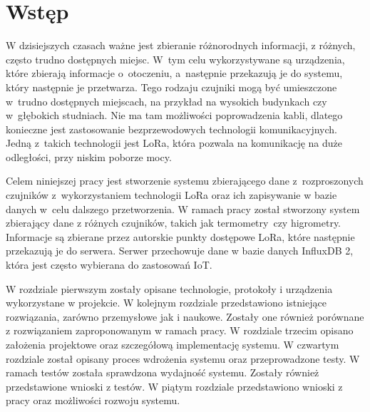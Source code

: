
\chapter*{Wstęp} %
W dzisiejszych czasach ważne jest zbieranie różnorodnych informacji, z różnych, często trudno dostępnych miejsc. W~tym celu wykorzystywane są urządzenia, które zbierają informacje o~otoczeniu, a~następnie przekazują je do systemu, który następnie je przetwarza. Tego rodzaju czujniki mogą być umieszczone w~trudno dostępnych miejscach, na przykład na wysokich budynkach czy w~głębokich studniach. Nie ma tam możliwości poprowadzenia kabli, dlatego konieczne jest zastosowanie bezprzewodowych technologii komunikacyjnych. Jedną z~takich technologii jest LoRa, która pozwala na komunikację na duże odległości, przy niskim poborze mocy.

Celem niniejszej pracy jest stworzenie systemu zbierającego dane z~rozproszonych czujników z~wykorzystaniem technologii LoRa oraz ich zapisywanie w bazie danych w~celu dalszego przetworzenia.
W ramach pracy został stworzony system zbierający dane z różnych czujników, takich jak termometry~czy higrometry.
Informacje są zbierane przez autorskie punkty dostępowe LoRa, które następnie przekazują je do serwera.
Serwer przechowuje dane w bazie danych InfluxDB 2, która jest często wybierana do zastosowań IoT.

W rozdziale pierwszym zostały opisane technologie, protokoły i urządzenia wykorzystane w projekcie.
W kolejnym rozdziale przedstawiono istniejące rozwiązania, zarówno przemysłowe jak i naukowe. Zostały one również porównane z rozwiązaniem zaproponowanym w ramach pracy.
W rozdziale trzecim opisano założenia projektowe oraz szczegółową implementację systemu.
W czwartym rozdziale został opisany proces wdrożenia systemu oraz przeprowadzone testy. W ramach testów została sprawdzona wydajność systemu. Zostały również przedstawione wnioski z testów.
W piątym rozdziale przedstawiono wnioski z pracy oraz możliwości rozwoju systemu.
